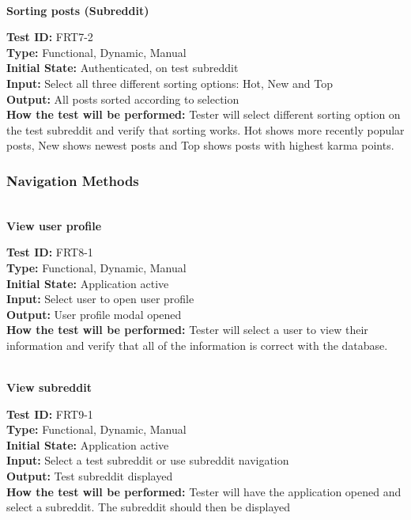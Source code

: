\documentclass[12pt,fleqn]{article}
\begin{document}
\newpage

\textbf{\\Sorting posts (Subreddit)}
\begin{tcolorbox}
\textbf{Test ID:} FRT7-2\\
\textbf{Type:} Functional, Dynamic, Manual\\
\textbf{Initial State:} Authenticated, on test subreddit\\
\textbf{Input:} Select all three different sorting options: Hot, New and Top \\
\textbf{Output:} All posts sorted according to selection\\
\textbf{How the test will be performed:} Tester will select different sorting option on the test subreddit and verify that sorting works. Hot shows more recently popular posts, New shows newest posts and Top shows posts with highest karma points.
\end{tcolorbox}

\subsubsection{Navigation Methods}

\textbf{\\View user profile}
\begin{tcolorbox}
\textbf{Test ID:} FRT8-1\\
\textbf{Type:} Functional, Dynamic, Manual\\
\textbf{Initial State:} Application active \\
\textbf{Input:} Select user to open user profile  \\
\textbf{Output:} User profile modal opened\\
\textbf{How the test will be performed:} Tester will select a user to view their information and verify that all of the information is correct with the database.
\end{tcolorbox}

\textbf{\\View subreddit}
\begin{tcolorbox}
\textbf{Test ID:} FRT9-1\\ %
\textbf{Type:} Functional, Dynamic, Manual\\
\textbf{Initial State:} Application active \\
\textbf{Input:} Select a test subreddit or use subreddit navigation \\
\textbf{Output:} Test subreddit displayed\\
\textbf{How the test will be performed:} Tester will have the application opened and select a subreddit. The subreddit should then be displayed
\end{tcolorbox}
\end{document}
